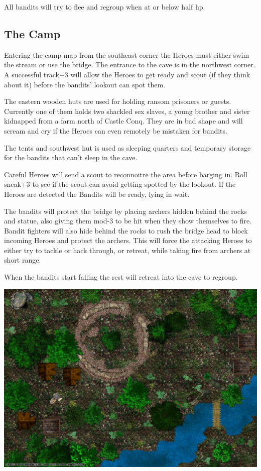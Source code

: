 All bandits will try to flee and regroup when at or below half hp.


\subsection*{The Camp}
Entering the camp map from the southeast corner the Heroes must either swim the stream or use the bridge. The entrance to the cave is in the northwest corner. A successful track+3 will allow the Heroes to get ready and scout (if they think about it) before the bandits' lookout can spot them.

The eastern wooden huts are used for holding ransom prisoners or guests. Currently one of them holds two shackled sex slaves, a young brother and sister kidnapped from a farm north of Castle Conq. They are in bad shape and will scream and cry if the Heroes can even remotely be mistaken for bandits.

The tents and southwest hut is used as sleeping quarters and temporary storage for the bandits that can't sleep in the cave.

Careful Heroes will send a scout to reconnoitre the area before barging in. Roll sneak+3 to see if the scout can avoid getting spotted by the lookout. If the Heroes are detected the Bandits will be ready, lying in wait.

The bandits will protect the bridge by placing archers hidden behind the rocks and statue, also giving them mod-3 to be hit when they show themselves to fire. Bandit fighters will also hide behind the rocks to rush the bridge head to block incoming Heroes and protect the archers. This will force the attacking Heroes to either try to tackle or hack through, or retreat, while taking fire from archers at short range.

When the bandits start falling the rest will retreat into the cave to regroup.

\begin{center}
\includegraphics[width=1.0\linewidth]{./maps/Eisenkrafs-Bandits-Camp-(32+0+0).jpg}
\end{center}

